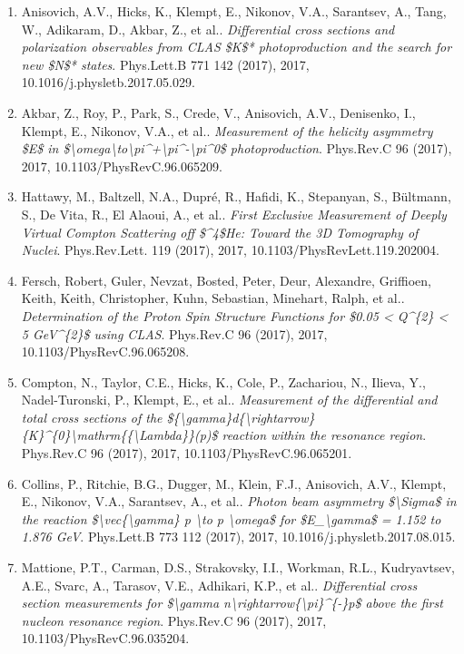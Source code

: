 \begin{enumerate}
\item Anisovich, A.V., Hicks, K., Klempt, E., Nikonov, V.A., Sarantsev, A., Tang, W., Adikaram, D., Akbar, Z., et al.. \textit{Differential cross sections and polarization observables from CLAS \$K\$* photoproduction and the search for new \$N\$* states}. Phys.Lett.B 771 142 (2017), 2017, 10.1016/j.physletb.2017.05.029.
\item Akbar, Z., Roy, P., Park, S., Crede, V., Anisovich, A.V., Denisenko, I., Klempt, E., Nikonov, V.A., et al.. \textit{Measurement of the helicity asymmetry \$E\$ in \$\textbackslash{}omega\textbackslash{}to\textbackslash{}pi\textasciicircum{}+\textbackslash{}pi\textasciicircum{}-\textbackslash{}pi\textasciicircum{}0\$ photoproduction}. Phys.Rev.C 96 (2017), 2017, 10.1103/PhysRevC.96.065209.
\item Hattawy, M., Baltzell, N.A., Dupré, R., Hafidi, K., Stepanyan, S., Bültmann, S., De Vita, R., El Alaoui, A., et al.. \textit{First Exclusive Measurement of Deeply Virtual Compton Scattering off \$\textasciicircum{}4\$He: Toward the 3D Tomography of Nuclei}. Phys.Rev.Lett. 119 (2017), 2017, 10.1103/PhysRevLett.119.202004.
\item Fersch, Robert, Guler, Nevzat, Bosted, Peter, Deur, Alexandre, Griffioen, Keith, Keith, Christopher, Kuhn, Sebastian, Minehart, Ralph, et al.. \textit{Determination of the Proton Spin Structure Functions for \$0.05 < Q\textasciicircum{}\{2\} < 5 GeV\textasciicircum{}\{2\}\$ using CLAS}. Phys.Rev.C 96 (2017), 2017, 10.1103/PhysRevC.96.065208.
\item Compton, N., Taylor, C.E., Hicks, K., Cole, P., Zachariou, N., Ilieva, Y., Nadel-Turonski, P., Klempt, E., et al.. \textit{Measurement of the differential and total cross sections of the \$\{\textbackslash{}gamma\}d\{\textbackslash{}rightarrow\}\{K\}\textasciicircum{}\{0\}\textbackslash{}mathrm\{\{\textbackslash{}Lambda\}\}(p)\$ reaction within the resonance region}. Phys.Rev.C 96 (2017), 2017, 10.1103/PhysRevC.96.065201.
\item Collins, P., Ritchie, B.G., Dugger, M., Klein, F.J., Anisovich, A.V., Klempt, E., Nikonov, V.A., Sarantsev, A., et al.. \textit{Photon beam asymmetry \$\textbackslash{}Sigma\$ in the reaction \$\textbackslash{}vec\{\textbackslash{}gamma\} p \textbackslash{}to p \textbackslash{}omega\$ for \$E\_\textbackslash{}gamma\$ = 1.152 to 1.876 GeV}. Phys.Lett.B 773 112 (2017), 2017, 10.1016/j.physletb.2017.08.015.
\item Mattione, P.T., Carman, D.S., Strakovsky, I.I., Workman, R.L., Kudryavtsev, A.E., Svarc, A., Tarasov, V.E., Adhikari, K.P., et al.. \textit{Differential cross section measurements for \$\textbackslash{}gamma n\textbackslash{}rightarrow\{\textbackslash{}pi\}\textasciicircum{}\{-\}p\$ above the first nucleon resonance region}. Phys.Rev.C 96 (2017), 2017, 10.1103/PhysRevC.96.035204.

\end{enumerate}
